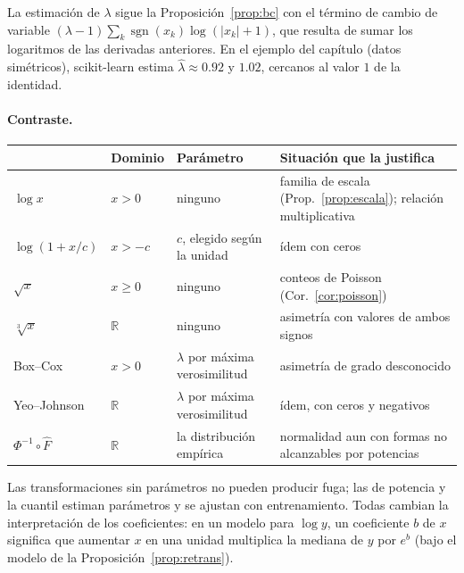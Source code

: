 \documentclass[11pt,a4paper]{article}
\theoremstyle{plain}
\theoremstyle{definition}
\theoremstyle{remark}
\newcommand{\R}{\mathbb{R}}
\newcommand{\1}{\mathbf{1}}
\begin{document}
La estimación de $\lambda$ sigue la Proposición~\ref{prop:bc} con el
término de cambio de variable
$(\lambda-1)\sum_k\operatorname{sgn}(x_k)\log(|x_k|+1)$, que resulta de
sumar los logaritmos de las derivadas anteriores. En el ejemplo del
capítulo (datos simétricos), scikit-learn estima $\hat\lambda\approx0.92$ y
$1.02$, cercanos al valor $1$ de la identidad.

\paragraph{Contraste.}
\begin{center}
\begin{tabularx}{\textwidth}{@{}lYYY@{}}
\toprule
& Dominio & Parámetro & Situación que la justifica\\
\midrule
$\log x$ & $x>0$ & ninguno & familia de escala (Prop.~\ref{prop:escala}); relación multiplicativa\\
$\log(1+x/c)$ & $x>-c$ & $c$, elegido según la unidad & ídem con ceros\\
$\sqrt x$ & $x\ge0$ & ninguno & conteos de Poisson (Cor.~\ref{cor:poisson})\\
$\sqrt[3]{x}$ & $\R$ & ninguno & asimetría con valores de ambos signos\\
Box--Cox & $x>0$ & $\lambda$ por máxima verosimilitud & asimetría de grado desconocido\\
Yeo--Johnson & $\R$ & $\lambda$ por máxima verosimilitud & ídem, con ceros y negativos\\
$\Phi^{-1}\circ\hat F$ & $\R$ & la distribución empírica & normalidad aun con formas no alcanzables por potencias\\
\bottomrule
\end{tabularx}
\end{center}
Las transformaciones sin parámetros no pueden producir fuga; las de
potencia y la cuantil estiman parámetros y se ajustan con entrenamiento.
Todas cambian la interpretación de los coeficientes: en un modelo para
$\log y$, un coeficiente $b$ de $x$ significa que aumentar $x$ en una
unidad multiplica la mediana de $y$ por $e^b$ (bajo el modelo de la
Proposición~\ref{prop:retrans}).
\end{document}
